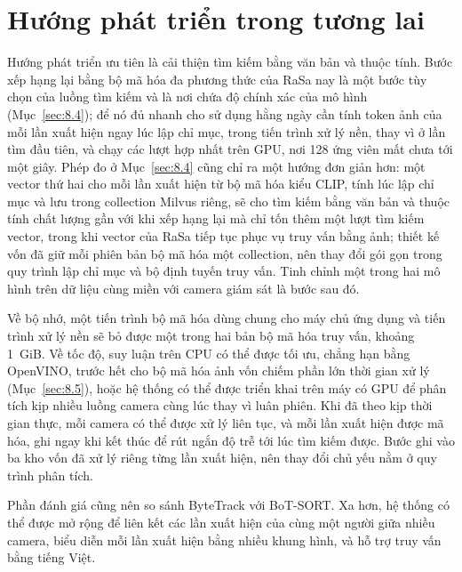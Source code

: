 \section{Hướng phát triển trong tương lai}
\label{sec:9.3}

Hướng phát triển ưu tiên là cải thiện tìm kiếm bằng văn bản và thuộc tính. Bước xếp hạng lại bằng bộ mã hóa đa phương thức của RaSa nay là một bước tùy chọn của luồng tìm kiếm và là nơi chứa độ chính xác của mô hình (Mục~\ref{sec:8.4}); để nó đủ nhanh cho sử dụng hằng ngày cần tính token ảnh của mỗi lần xuất hiện ngay lúc lập chỉ mục, trong tiến trình xử lý nền, thay vì ở lần tìm đầu tiên, và chạy các lượt hợp nhất trên GPU, nơi 128 ứng viên mất chưa tới một giây. Phép đo ở Mục~\ref{sec:8.4} cũng chỉ ra một hướng đơn giản hơn: một vector thứ hai cho mỗi lần xuất hiện từ bộ mã hóa kiểu CLIP, tính lúc lập chỉ mục và lưu trong collection Milvus riêng, sẽ cho tìm kiếm bằng văn bản và thuộc tính chất lượng gần với khi xếp hạng lại mà chỉ tốn thêm một lượt tìm kiếm vector, trong khi vector của RaSa tiếp tục phục vụ truy vấn bằng ảnh; thiết kế vốn đã giữ mỗi phiên bản bộ mã hóa một collection, nên thay đổi gói gọn trong quy trình lập chỉ mục và bộ định tuyến truy vấn. Tinh chỉnh một trong hai mô hình trên dữ liệu cùng miền với camera giám sát là bước sau đó.

Về bộ nhớ, một tiến trình bộ mã hóa dùng chung cho máy chủ ứng dụng và tiến trình xử lý nền sẽ bỏ được một trong hai bản bộ mã hóa truy vấn, khoảng 1~GiB. Về tốc độ, suy luận trên CPU có thể được tối ưu, chẳng hạn bằng OpenVINO, trước hết cho bộ mã hóa ảnh vốn chiếm phần lớn thời gian xử lý (Mục~\ref{sec:8.5}), hoặc hệ thống có thể được triển khai trên máy có GPU để phân tích kịp nhiều luồng camera cùng lúc thay vì luân phiên. Khi đã theo kịp thời gian thực, mỗi camera có thể được xử lý liên tục, và mỗi lần xuất hiện được mã hóa, ghi ngay khi kết thúc để rút ngắn độ trễ tới lúc tìm kiếm được. Bước ghi vào ba kho vốn đã xử lý riêng từng lần xuất hiện, nên thay đổi chủ yếu nằm ở quy trình phân tích.

Phần đánh giá cũng nên so sánh ByteTrack với BoT-SORT. Xa hơn, hệ thống có thể được mở rộng để liên kết các lần xuất hiện của cùng một người giữa nhiều camera, biểu diễn mỗi lần xuất hiện bằng nhiều khung hình, và hỗ trợ truy vấn bằng tiếng Việt.
